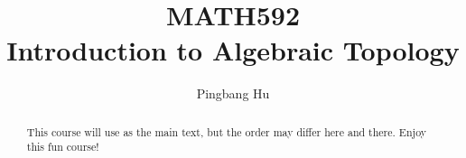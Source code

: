 \documentclass[a4paper]{article}
\author{Pingbang Hu}
\title{MATH592\\Introduction to Algebraic Topology}
\begin{document}
\maketitle

\begin{abstract}
	This course will use \cite{hatcher2002algebraic} as the main text, but the order may differ here and there. Enjoy this fun
	course!
\end{abstract}

\tableofcontents


\newpage
\appendix
\appendixpage



\newpage
\printbibliography
\end{document}
